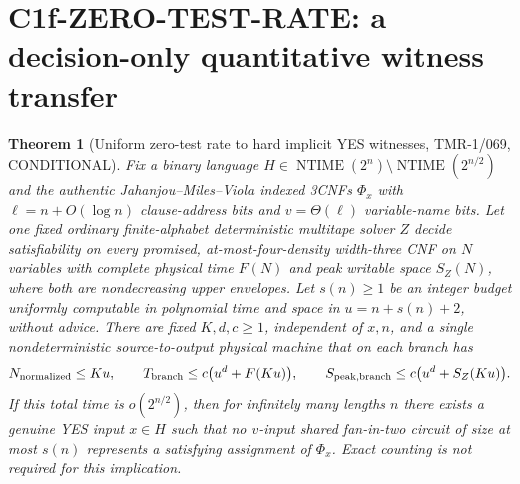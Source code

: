 \documentclass[11pt]{article}
\newtheorem{theorem}{Theorem}
\begin{document}
\section{C1f-ZERO-TEST-RATE: a decision-only quantitative witness transfer}
\begin{theorem}[Uniform zero-test rate to hard implicit YES witnesses, TMR-1/069, CONDITIONAL]
Fix a binary language
$H\in\operatorname{NTIME}(2^n)\setminus\operatorname{NTIME}(2^{n/2})$
and the authentic Jahanjou--Miles--Viola indexed 3CNFs
$\Phi_x$ with $\ell=n+O(\log n)$ clause-address bits and
$v=\Theta(\ell)$ variable-name bits.
Let one fixed ordinary finite-alphabet deterministic multitape
solver $Z$ decide satisfiability on every promised, at-most-four-density
width-three CNF on $N$ variables with complete physical time
$F(N)$ and peak writable space $S_Z(N)$, where both are
nondecreasing upper envelopes. Let $s(n)\ge1$ be an integer
budget uniformly computable in polynomial time and space
in $u=n+s(n)+2$, without advice. There are fixed
$K,d,c\ge1$, independent of $x,n$, and a \emph{single}
nondeterministic source-to-output physical machine
that on each branch has
\[
N_{\rm normalized}\le Ku,\qquad
T_{\rm branch}\le c\bigl(u^d+F(Ku)\bigr),\qquad
S_{\rm peak,branch}\le c\bigl(u^d+S_Z(Ku)\bigr).
\]
If this total time is $o(2^{n/2})$, then for infinitely
many lengths $n$ there exists a genuine YES input $x\in H$
such that \emph{no} $v$-input shared fan-in-two circuit of
size at most $s(n)$ represents a satisfying assignment of $\Phi_x$.
Exact counting is \emph{not} required for this implication.
\end{theorem}
\end{document}
